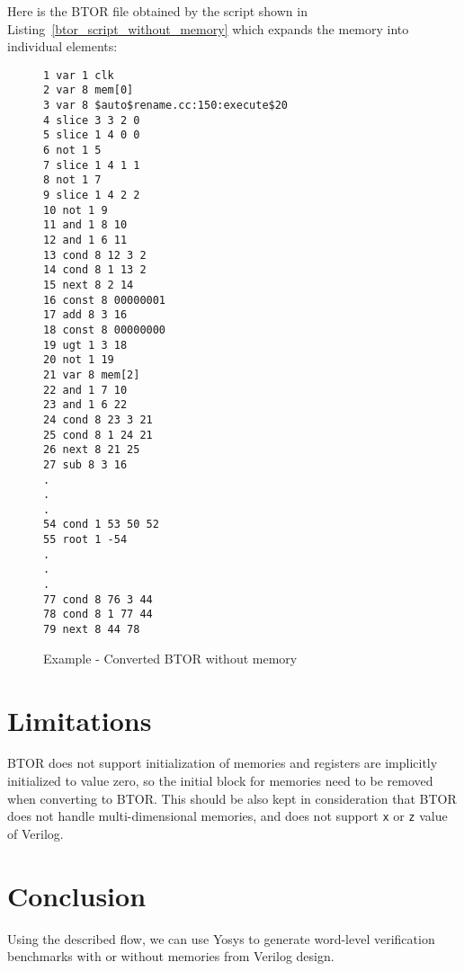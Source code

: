 \documentclass[9pt,technote,a4paper]{IEEEtran}
\begin{document}
Here is the BTOR file obtained by the script shown in
Listing~\ref{btor_script_without_memory} which expands the memory
into individual elements:
\begin{figure}[H]
\begin{lstlisting}[numbers=none]
1 var 1 clk
2 var 8 mem[0]
3 var 8 $auto$rename.cc:150:execute$20
4 slice 3 3 2 0
5 slice 1 4 0 0
6 not 1 5
7 slice 1 4 1 1
8 not 1 7
9 slice 1 4 2 2
10 not 1 9
11 and 1 8 10
12 and 1 6 11
13 cond 8 12 3 2
14 cond 8 1 13 2
15 next 8 2 14
16 const 8 00000001
17 add 8 3 16
18 const 8 00000000
19 ugt 1 3 18
20 not 1 19
21 var 8 mem[2]
22 and 1 7 10
23 and 1 6 22
24 cond 8 23 3 21
25 cond 8 1 24 21
26 next 8 21 25
27 sub 8 3 16
.
.
.
54 cond 1 53 50 52
55 root 1 -54
.
.
.
77 cond 8 76 3 44
78 cond 8 1 77 44
79 next 8 44 78
\end{lstlisting}
\renewcommand{\figurename}{Listing}
\caption{Example - Converted BTOR without memory}
\label{example_btor}
\end{figure}

\section{Limitations}

BTOR does not support initialization of memories and registers are
implicitly initialized to value zero, so the initial block for
memories need to be removed when converting to BTOR. This should be
also kept in consideration that BTOR does not handle multi-dimensional
memories, and does not support {\tt x} or {\tt z} value of Verilog.


\section{Conclusion}

Using the described flow, we can use Yosys to generate word-level
verification benchmarks with or without memories from Verilog design.
\end{document}
